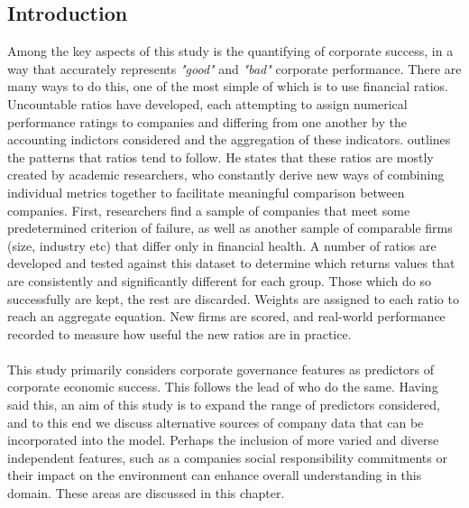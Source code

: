 \subsection{Introduction}
{Among the key aspects of this study is the quantifying of corporate success, in a way that accurately represents {\it "good"} and {\it "bad"} corporate performance. There are many ways to do this, one of the most simple of which is to use financial ratios. Uncountable ratios have developed, each attempting to assign numerical performance ratings to companies and differing from one another by the accounting indictors considered and the aggregation of these indicators. \cite {eidleman1995z} outlines the patterns that ratios tend to follow. He states that these ratios are mostly created by academic researchers, who constantly derive new ways of combining individual metrics together to facilitate meaningful comparison between companies. First, researchers find a sample of companies that meet some predetermined criterion of failure, as well as another sample of comparable firms (size, industry etc) that differ only in financial health. A number of ratios are developed and tested against this dataset to determine which returns values that are consistently and significantly different for each group. Those which do so successfully are kept, the rest are discarded. Weights are assigned to each ratio to reach an aggregate equation. New firms are scored, and real-world performance recorded to measure how useful the new ratios are in practice. \\\\
This study primarily considers corporate governance features as predictors of corporate economic success. This follows the lead of \cite{moldovan2015learning} who do the same. Having said this, an aim of this study is to expand the range of predictors considered, and to this end we discuss alternative sources of company data that can be incorporated into the model. Perhaps the inclusion of more varied and diverse independent features, such as a companies social responsibility commitments or their impact on the environment can enhance overall understanding in this domain. These areas are discussed in this chapter.    }
